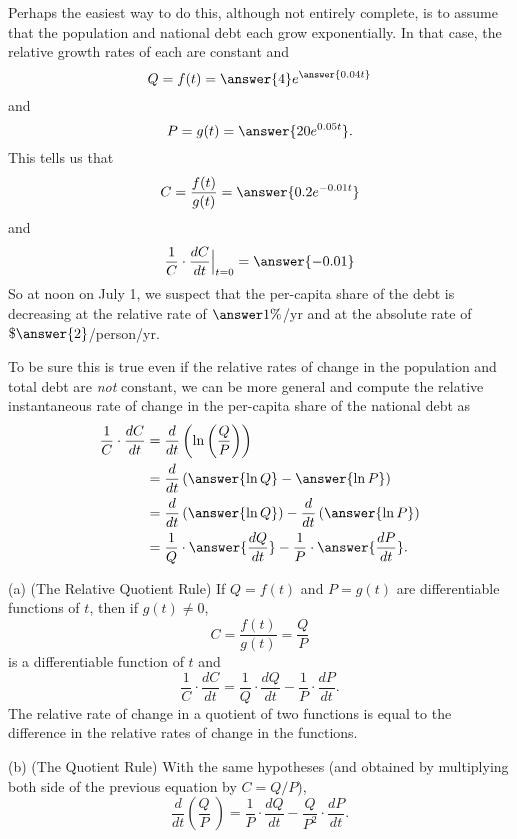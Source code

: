 \documentclass{ximera}
\begin{document}
\begin{question}
\begin{explanation}
Perhaps the easiest way to do this, although not entirely complete, is to assume that the population and national debt each grow exponentially. In that case, the relative growth rates of each are constant and 
\[
    Q = f(t) = \answer{4}e^{\answer{0.04t}}
\]
and 
\[
      P = g(t) = \answer{20e^{0.05t}} .
\]
This tells us that
\[
       C = \frac{f(t)}{g(t)} = \answer{0.2 e^{-0.01t}}
\]
and
\[
       \frac{1}{C} \cdot \frac{dC}{dt} \Big|_{t=0} = \answer{-0.01} 
\]
So at noon on July 1, we suspect that the per-capita share of the debt is decreasing at the relative rate of $\answer{1\%}$/yr
and at the absolute rate of $\$\answer{2}$/person/yr.

To be sure this is true even if the relative rates of change in the population and total debt are \emph{not} constant, we can be more general and compute the relative instantaneous rate of change in the per-capita share of the national debt as
\begin{align*}
        \frac{1}{C} \cdot \frac{dC}{dt} &= \frac{d}{dt}\left( \ln \left(\frac{Q}{P}\right)  \right) \\
                                                      &= \frac{d}{dt} \left(  \answer{\ln Q} - \answer{\ln P}     \right) \\
                                                      &= \frac{d}{dt} \left( \answer{\ln Q} \right) - \frac{d}{dt} \left(  \answer{\ln P} \right)  \\
                                                      &= \frac{1}{Q} \cdot \answer{\frac{dQ}{dt}} - \frac{1}{P} \cdot \answer{\frac{dP}{dt}} .
\end{align*}


\end{explanation}
\end{question}


\begin{theorem}
(a) (The Relative Quotient Rule)
If $Q=f(t)$ and $P=g(t)$ are differentiable functions of $t$, then if $g(t)\neq 0$,
\[
     C = \frac{f(t)}{g(t)} = \frac{Q}{P}
\]
is a differentiable function of $t$ and
\[
\frac{1}{C} \cdot \frac{dC}{dt} = \frac{1}{Q} \cdot \frac{dQ}{dt} - \frac{1}{P} \cdot \frac{dP}{dt}.
\]
The relative rate of change in a quotient of two functions is equal to the difference in the relative rates of change in the functions.

(b) (The Quotient Rule) With the same hypotheses (and obtained by multiplying both side of the previous equation by $C=Q/P$), 
\[
       \frac{d}{dt}\left( \frac{Q}{P} \ \right) = \frac{1}{P} \cdot \frac{dQ}{dt} - \frac{Q}{P^2} \cdot \frac{dP}{dt} .
\]
\end{theorem}
\end{document}
